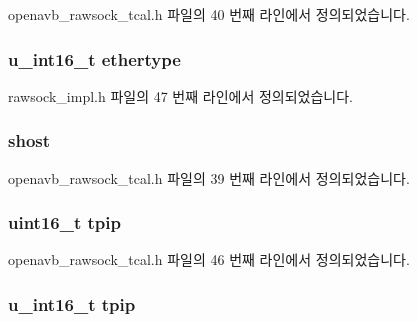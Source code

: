 openavb\+\_\+rawsock\+\_\+tcal.\+h 파일의 40 번째 라인에서 정의되었습니다.

\subsubsection[{\texorpdfstring{ethertype}{ethertype}}]{\setlength{\rightskip}{0pt plus 5cm}u\+\_\+int16\+\_\+t ethertype}\hypertarget{struct____attribute_____aa3277a0009d97b5ec894357c7ce532cd}{}\label{struct____attribute_____aa3277a0009d97b5ec894357c7ce532cd}


rawsock\+\_\+impl.\+h 파일의 47 번째 라인에서 정의되었습니다.

\subsubsection[{\texorpdfstring{shost}{shost}}]{ shost}\hypertarget{struct____attribute_____ab9e6e094fa8006980b1a99e0c8e37432}{}\label{struct____attribute_____ab9e6e094fa8006980b1a99e0c8e37432}


openavb\+\_\+rawsock\+\_\+tcal.\+h 파일의 39 번째 라인에서 정의되었습니다.

\subsubsection[{\texorpdfstring{tpip}{tpip}}]{\setlength{\rightskip}{0pt plus 5cm}uint16\+\_\+t tpip}\hypertarget{struct____attribute_____a2599bbd7f1fc82592e2364e874ea25af}{}\label{struct____attribute_____a2599bbd7f1fc82592e2364e874ea25af}


openavb\+\_\+rawsock\+\_\+tcal.\+h 파일의 46 번째 라인에서 정의되었습니다.

\subsubsection[{\texorpdfstring{tpip}{tpip}}]{\setlength{\rightskip}{0pt plus 5cm}u\+\_\+int16\+\_\+t tpip}\hypertarget{struct____attribute_____ae6119a7211229b490a6e60b7c14c7c34}{}\label{struct____attribute_____ae6119a7211229b490a6e60b7c14c7c34}


